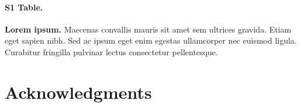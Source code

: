 \documentclass[10pt,letterpaper]{article}
\begin{document}
\paragraph*{S1 Table.}
\label{S1_Table}
{\bf Lorem ipsum.} Maecenas convallis mauris sit amet sem ultrices gravida. Etiam eget sapien nibh. Sed ac ipsum eget enim egestas ullamcorper nec euismod ligula. Curabitur fringilla pulvinar lectus consectetur pellentesque.

\section*{Acknowledgments}

%
%
% 



\end{document}
